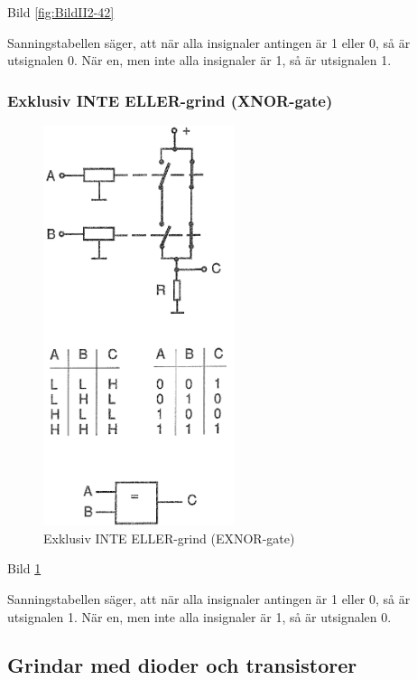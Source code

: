Bild \ref{fig:BildII2-42}

Sanningstabellen säger, att när alla insignaler antingen är 1 eller 0, så är
utsignalen 0. När en, men inte alla insignaler är 1, så är utsignalen 1.

\subsubsection{Exklusiv INTE ELLER-grind (XNOR-gate)}

\begin{figure}
\includegraphics[width=0.5\textwidth]{images/bild_2_2-43.png}
\caption{Exklusiv INTE ELLER-grind (EXNOR-gate)}
\label{fig:BildII2-43}
\end{figure}

Bild \ref{fig:BildII2-43}

Sanningstabellen säger, att när alla insignaler antingen är 1 eller 0, så är
utsignalen 1. När en, men inte alla insignaler är 1, så är utsignalen 0.

\subsection{Grindar med dioder och transistorer}

